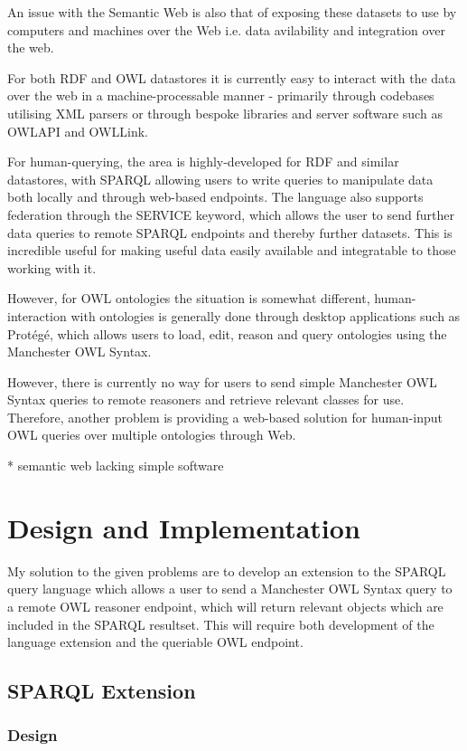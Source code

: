 \documentclass{article}
\begin{document}
An issue with the Semantic Web is also that of exposing these datasets to use by
computers and machines over the Web i.e. data avilability and integration over
the web.

For both RDF and OWL datastores it is currently easy to interact with the data
over the web in a machine-processable manner - primarily through codebases
utilising XML parsers or through bespoke libraries and server software such as 
OWLAPI and OWLLink.

For human-querying, the area is highly-developed for RDF and similar datastores, 
with SPARQL allowing users to write queries to manipulate data both locally and
through web-based endpoints. The language also supports federation through the
SERVICE keyword, which allows the user to send further data queries to remote
SPARQL endpoints and thereby further datasets. This is incredible useful for
making useful data easily available and integratable to those working with it.

However, for OWL ontologies the situation is somewhat different,
human-interaction with ontologies is generally done through desktop applications
such as Protégé, which allows users to load, edit, reason and query ontologies 
using the Manchester OWL Syntax.

However, there is currently no way for users to send simple Manchester OWL
Syntax queries to remote reasoners and retrieve relevant classes for use. 
Therefore, another problem is providing a web-based solution for human-input OWL
queries over multiple ontologies through Web. 

* semantic web lacking simple software

\section{Design and Implementation}

My solution to the given problems are to develop an extension to the SPARQL
query language which allows a user to send a Manchester OWL Syntax query to a
remote OWL reasoner endpoint, which will return relevant objects which are
included in the SPARQL resultset. This will require both development of the
language extension and the queriable OWL endpoint.

\subsection{SPARQL Extension}

\subsubsection{Design}
\end{document}
